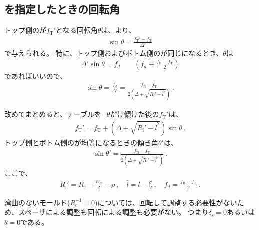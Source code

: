 \subsection{\AlocationLength を指定したときの回転角}
トップ側の\AlocationLength が$f_\mathrm T'$となる回転角$\theta$は、より、
\begin{align*}
  \sin\theta = \frac{f_\mathrm T'-f_\mathrm T}{\Delta'}
\end{align*}
で与えられる。
特に、トップ側およびボトム側の\AlocationLength が同じになるとき、$\theta$は
\begin{align*}
  \Delta'\sin\theta = f_d \qquad \left(f_d \equiv \frac{f_\mathrm B-f_\mathrm T}2\right)
\end{align*}
であればいいので、
\begin{align*}
  \sin\theta = \frac{f_d}{\Delta'}
  = \frac{f_\mathrm B-f_\mathrm T}{2\left(\Delta+\sqrt{R_\mathrm i'-\bar l^2}\right)}~.
\end{align*}
\begin{hosoku}
改めてまとめると、テーブルを$-\theta$だけ傾けた後の\TopReAlocationLength$f_\mathrm T'$は、
\begin{align*}
  f_\mathrm T' = f_\mathrm T+\left(\Delta+\sqrt{R_\mathrm i'-\bar l^2}\right)\sin\theta\ .
\end{align*}
トップ側とボトム側の\AlocationLength が均等になるときの傾き角$\theta'$は、
\begin{align*}
  \sin\theta' = \frac{f_\mathrm B-f_\mathrm T}{2\left(\Delta+\sqrt{R_\mathrm i'-\bar l^2}\right)}\ .
\end{align*}
ここで、
\begin{align*}
  R_\mathrm i' = R_\mathrm c-\frac{W_x}2-\rho\ ,\quad
  \bar l = l-\frac\sigma2\ ,\quad
  f_d = \frac{f_\mathrm B-f_\mathrm T}2\ .
\end{align*}
\end{hosoku}



湾曲のないモールド($R_\mathrm c^{-1}= 0$)については、回転して調整する必要性がないため、スペーサによる調整も回転による調整も必要がない。
つまり$\delta_\mathrm s = 0$あるいは$\theta = 0$である。


